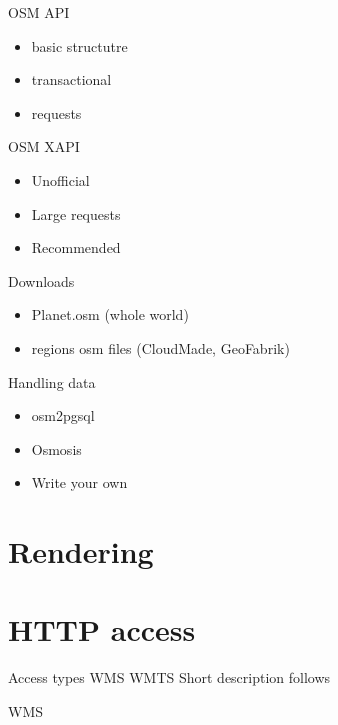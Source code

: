 \documentclass{beamer}
\begin{document}
\begin{frame}{OSM API}
  \begin{itemize}
  \item basic structutre
  \item transactional
  \item requests
  \end{itemize}
\end{frame}

\begin{frame}{OSM XAPI}
  \begin{itemize}
  \item Unofficial
  \item Large requests
  \item Recommended
  \end{itemize}
\end{frame}

\begin{frame}{Downloads}
  \begin{itemize}
  \item Planet.osm (whole world)
  \item regions osm files (CloudMade, GeoFabrik)
  \end{itemize}
\end{frame}

\begin{frame}{Handling data}
  \begin{itemize}
  \item osm2pgsql
  \item Osmosis
  \item Write your own
  \end{itemize}
\end{frame}

\section{Rendering}




\section{HTTP access}

\begin{frame}{Access types}
  WMS
  WMTS
  Short description follows
\end{frame}

\begin{frame}{WMS}

\end{frame}
\end{document}
